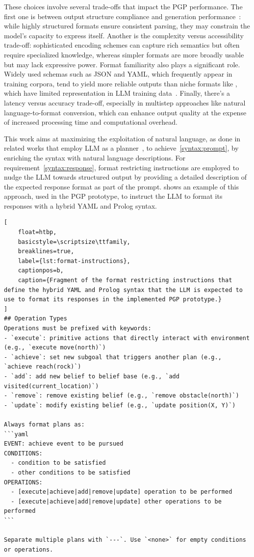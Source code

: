 \documentclass[12pt,a4paper,openright,twoside]{book}
\begin{document}
These choices involve several trade-offs that impact the PGP performance.
%
The first one is between output structure compliance and generation performance~\cite{tamLetMeSpeak2024}: while highly structured formats ensure consistent parsing, they may constrain the model's capacity to express itself.
%
Another is the complexity versus accessibility trade-off: sophisticated encoding schemes can capture rich semantics but often require specialized knowledge, whereas simpler formats are more broadly usable but may lack expressive power.
%
Format familiarity also plays a significant role. Widely used schemas such as JSON and YAML, which frequently appear in training corpora, tend to yield more reliable outputs than niche formats like \agentspeak{}, which have limited representation in LLM training data~\cite{yangStructEvalBenchmarkingLLMs2025, longLLMsAreBiased2025}.
%
Finally, there's a latency versus accuracy trade-off, especially in multistep approaches like natural language-to-format conversion, which can enhance output quality at the expense of increased processing time and computational overhead.

This work aims at maximizing the exploitation of natural language, as done in related works that employ \acs{LLM} as a planner~\cite{Murugesan25a}, to achieve~\ref{syntax:prompt}, by enriching the \agentspeak{} syntax with natural language descriptions.
%
For requirement~\ref{syntax:response}, format restricting instructions are employed to nudge the LLM towards structured output by providing a detailed description of the expected response format as part of the prompt.
%
 shows an example of this approach, used in the PGP prototype, to instruct the LLM to format its responses with a hybrid YAML and Prolog syntax.

\begin{lstlisting}[
    float=htbp,
    basicstyle=\scriptsize\ttfamily,
    breaklines=true,
    label={lst:format-instructions},
    captionpos=b,
    caption={Fragment of the format restricting instructions that define the hybrid YAML and Prolog syntax that the LLM is expected to use to format its responses in the implemented PGP prototype.}
]
## Operation Types
Operations must be prefixed with keywords:
- `execute`: primitive actions that directly interact with environment (e.g., `execute move(north)`)
- `achieve`: set new subgoal that triggers another plan (e.g., `achieve reach(rock)`)
- `add`: add new belief to belief base (e.g., `add visited(current_location)`)
- `remove`: remove existing belief (e.g., `remove obstacle(north)`)
- `update`: modify existing belief (e.g., `update position(X, Y)`)

Always format plans as:
```yaml
EVENT: achieve event to be pursued
CONDITIONS:
  - condition to be satisfied
  - other conditions to be satisfied
OPERATIONS:
  - [execute|achieve|add|remove|update] operation to be performed
  - [execute|achieve|add|remove|update] other operations to be performed
```

Separate multiple plans with `---`. Use `<none>` for empty conditions or operations.
\end{lstlisting}
\end{document}
